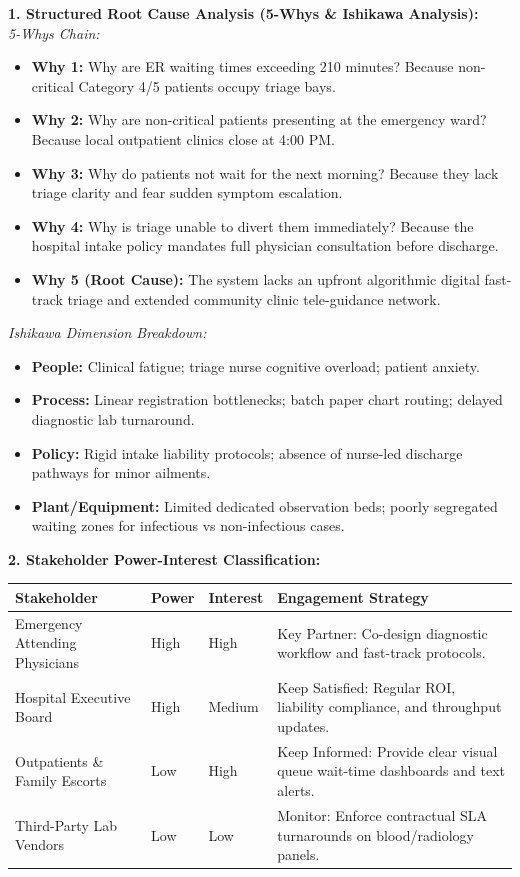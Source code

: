 \begin{solbox}
\textbf{1. Structured Root Cause Analysis (5-Whys \& Ishikawa Analysis):}\\
\textit{5-Whys Chain:}
\begin{itemize}
    \item \textbf{Why 1:} Why are ER waiting times exceeding 210 minutes? Because non-critical Category 4/5 patients occupy triage bays.
    \item \textbf{Why 2:} Why are non-critical patients presenting at the emergency ward? Because local outpatient clinics close at 4:00 PM.
    \item \textbf{Why 3:} Why do patients not wait for the next morning? Because they lack triage clarity and fear sudden symptom escalation.
    \item \textbf{Why 4:} Why is triage unable to divert them immediately? Because the hospital intake policy mandates full physician consultation before discharge.
    \item \textbf{Why 5 (Root Cause):} The system lacks an upfront algorithmic digital fast-track triage and extended community clinic tele-guidance network.
\end{itemize}

\textit{Ishikawa Dimension Breakdown:}
\begin{itemize}
    \item \textbf{People:} Clinical fatigue; triage nurse cognitive overload; patient anxiety.
    \item \textbf{Process:} Linear registration bottlenecks; batch paper chart routing; delayed diagnostic lab turnaround.
    \item \textbf{Policy:} Rigid intake liability protocols; absence of nurse-led discharge pathways for minor ailments.
    \item \textbf{Plant/Equipment:} Limited dedicated observation beds; poorly segregated waiting zones for infectious vs non-infectious cases.
\end{itemize}

\textbf{2. Stakeholder Power-Interest Classification:}\\
\begin{tabularx}{\linewidth}{|l|l|l|X|} \hline
\textbf{Stakeholder} & \textbf{Power} & \textbf{Interest} & \textbf{Engagement Strategy} \\ \hline
Emergency Attending Physicians & High & High & Key Partner: Co-design diagnostic workflow and fast-track protocols. \\ \hline
Hospital Executive Board & High & Medium & Keep Satisfied: Regular ROI, liability compliance, and throughput updates. \\ \hline
Outpatients \& Family Escorts & Low & High & Keep Informed: Provide clear visual queue wait-time dashboards and text alerts. \\ \hline
Third-Party Lab Vendors & Low & Low & Monitor: Enforce contractual SLA turnarounds on blood/radiology panels. \\ \hline
\end{tabularx}


\end{solbox}
